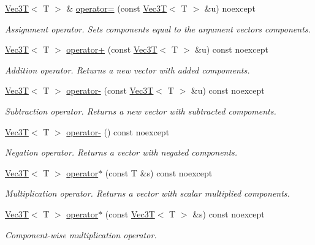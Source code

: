\begin{DoxyCompactItemize}
\hyperlink{classVec3T}{Vec3T}$<$ T $>$ \& \hyperlink{classVec3T_a34681a81b55b4e7ae818e01b5f27a3e0}{operator=} (const \hyperlink{classVec3T}{Vec3T}$<$ T $>$ \&u) noexcept
\begin{DoxyCompactList}\small\item\em Assignment operator. Sets components equal to the argument vector\textquotesingle{}s components. \end{DoxyCompactList}\item 
\hyperlink{classVec3T}{Vec3T}$<$ T $>$ \hyperlink{classVec3T_af1ab895de89a1a3143f58d2ce5d78bc2}{operator+} (const \hyperlink{classVec3T}{Vec3T}$<$ T $>$ \&u) const noexcept
\begin{DoxyCompactList}\small\item\em Addition operator. Returns a new vector with added compoments. \end{DoxyCompactList}\item 
\hyperlink{classVec3T}{Vec3T}$<$ T $>$ \hyperlink{classVec3T_ac00a70e55a93ecd8c60d29a129f8fbf3}{operator-\/} (const \hyperlink{classVec3T}{Vec3T}$<$ T $>$ \&u) const noexcept
\begin{DoxyCompactList}\small\item\em Subtraction operator. Returns a new vector with subtracted compoments. \end{DoxyCompactList}\item 
\mbox{\label{classVec3T_a2d32936bb5a9ddc22152d301723bc3e0}} 
\hyperlink{classVec3T}{Vec3T}$<$ T $>$ \hyperlink{classVec3T_a2d32936bb5a9ddc22152d301723bc3e0}{operator-\/} () const noexcept
\begin{DoxyCompactList}\small\item\em Negation operator. Returns a vector with negated components. \end{DoxyCompactList}\item 
\hyperlink{classVec3T}{Vec3T}$<$ T $>$ \hyperlink{classVec3T_aa4768276707889db34a716e9e476b9f1}{operator$\ast$} (const T \&s) const noexcept
\begin{DoxyCompactList}\small\item\em Multiplication operator. Returns a vector with scalar multiplied components. \end{DoxyCompactList}\item 
\hyperlink{classVec3T}{Vec3T}$<$ T $>$ \hyperlink{classVec3T_a579db6fb2bed30b3f024d1a017d7a124}{operator$\ast$} (const \hyperlink{classVec3T}{Vec3T}$<$ T $>$ \&s) const noexcept
\begin{DoxyCompactList}\small\item\em Component-\/wise multiplication operator. \end{DoxyCompactList}\item 

\end{DoxyCompactItemize}
